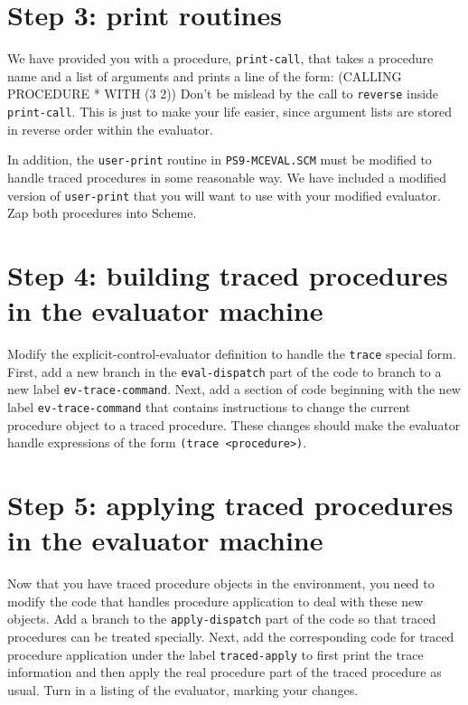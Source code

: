 \section{Step 3: print routines}

We have provided you with a procedure, {\tt print-call}, that takes a 
procedure name and a list of arguments and prints a line of the form:
\beginlisp
        (CALLING PROCEDURE * WITH (3 2))
\endlisp
Don't be mislead by the call to {\tt reverse} inside {\tt print-call}.
This is just to make your life easier, since argument lists are stored
in reverse order within the evaluator.

In addition, the {\tt user-print} routine in {\tt PS9-MCEVAL.SCM}
must be modified to handle traced procedures in some reasonable way.
We have included a modified version of {\tt user-print} that you will
want to use with your modified evaluator.  Zap both procedures into
Scheme.

\section{Step 4: building traced procedures in the evaluator machine}

Modify the explicit-control-evaluator definition to handle the {\tt trace} 
special form.  First, add a new branch in the {\tt eval-dispatch} part of the 
code to branch to a new label {\tt ev-trace-command}.  Next, add a section 
of code beginning with the new label {\tt ev-trace-command} that contains 
instructions to change the current procedure object to a traced procedure.  
These changes should make the evaluator handle expressions of the form
{\tt (trace <procedure>)}. 

\section{Step 5: applying traced procedures in the evaluator machine}

Now that you have traced procedure objects in the environment, you need to
modify the code that handles procedure application to deal with these new 
objects.  Add a branch to the {\tt apply-dispatch} part of the code so that 
traced procedures can be treated specially.  Next, add the corresponding code 
for traced procedure application under the label {\tt traced-apply} to first 
print the trace information and then apply the real procedure part of the 
traced procedure as usual. Turn in a listing of the evaluator, marking your 
changes.  

